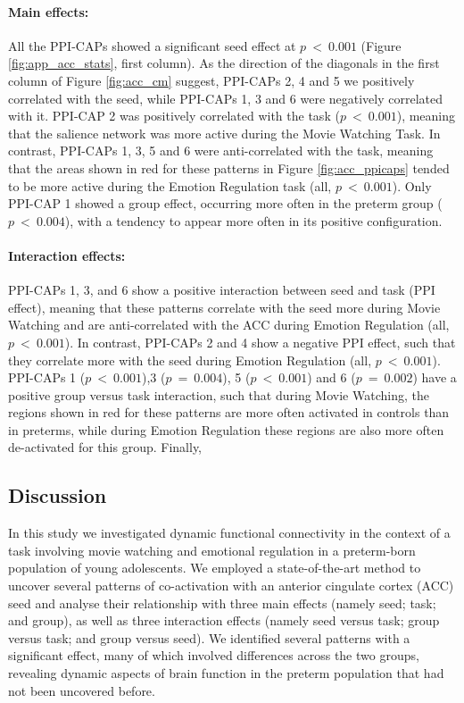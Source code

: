 \paragraph{Main effects:}
All the PPI-CAPs showed a significant seed effect at $p~<~0.001$ (Figure \ref{fig:app_acc_stats}, first column). As the direction of the diagonals in the first column of Figure \ref{fig:acc_cm} suggest, PPI-CAPs 2, 4 and 5 we positively correlated with the seed, while PPI-CAPs 1, 3 and 6 were negatively correlated with it. PPI-CAP 2 was positively correlated with the task ($p~<~0.001$), meaning that the salience network was more active during the Movie Watching Task. In contrast, PPI-CAPs 1, 3, 5 and 6 were anti-correlated with the task, meaning that the areas shown in red for these patterns in Figure \ref{fig:acc_ppicaps} tended to be more active during the Emotion Regulation task (all, $p~<~0.001$). Only PPI-CAP 1 showed a group effect, occurring more often in the preterm group ( $p~<~0.004$), with a tendency to appear more often in its positive configuration.

\paragraph{Interaction effects:}
PPI-CAPs 1, 3, and 6 show  a positive interaction between seed and task (PPI effect), meaning that these patterns correlate with the seed more during Movie Watching and are anti-correlated with the ACC during  Emotion Regulation (all, $p~<~0.001$). In contrast, PPI-CAPs 2 and 4 show a negative PPI effect, such that they correlate more with the seed during Emotion Regulation (all, $p~<~0.001$). PPI-CAPs 1 ($p~<~0.001$),3 ($p~=~0.004$), 5 ($p~<~0.001$) and 6 ($p~=~0.002$) have a positive group versus task interaction, such that during Movie Watching, the regions shown in red for these patterns are more often activated in controls than in preterms, while during Emotion Regulation these regions are also more often de-activated for this group. Finally, 







\subsection{Discussion}
In this study we investigated dynamic functional connectivity in the context of a task involving movie watching and emotional regulation in a preterm-born population of young adolescents. We employed a state-of-the-art method to uncover several patterns of co-activation with an anterior cingulate cortex (ACC) seed and analyse their relationship with three main effects (namely seed; task; and group), as well as three interaction effects (namely seed versus task; group versus task; and group versus seed). We identified several patterns with a significant effect, many of which involved differences across the two groups, revealing dynamic aspects of brain function in the preterm population that had not been uncovered before. 

